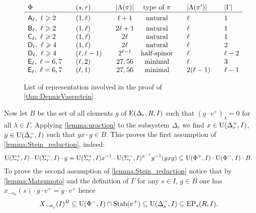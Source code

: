 \begin{figure}
\[\begin{array}{l @{\qquad} l @{\qquad} c @{\quad} c @{\qquad} l @{\qquad} l}
\Phi                                 & (s,r)         & |\Lambda(\pi)| & \text{type of $\pi$} & |\Lambda(\pi')|& |\Gamma|  \\ \hline\vphantom{\Bigl(}
\rA_\ell,\ \ell\geqslant 2           & (1,\ell)      & \ell+1         & \text{natural}       & \ell           & 1  \\     
\rB_\ell,\ \ell\geqslant 2           & (1,\ell)      & 2\ell+1        & \text{natural}       & \ell           & 1  \\     
\rC_\ell,\ \ell\geqslant 2           & (1,\ell)      & 2\ell          & \text{natural}       & \ell           & 1  \\
\rD_\ell,\ \ell\geqslant 4           & (1,\ell)      & 2\ell          & \text{natural}       & \ell           & 2  \\ 
\rD_\ell,\ \ell\geqslant 4           & (\ell,\ell-1) & 2^{\ell-1}     & \text{half-spinor}   & \ell           & \ell-2  \\
\rE_\ell,\ \ell=6,7                  & (\ell,2)      & 27, 56         & \text{minimal}       & \ell           & 3       \\ 
\rE_\ell,\ \ell=6,7                  & (\ell,1)      & 27, 56         & \text{minimal}       & 2(\ell-1)      & \ell-1  \end{array}\]
 \caption[Table]{List of representation involved in the proof of \cref{thm:DennisVaserstein}.} \label{fig:table}
\end{figure}

Now let $B$ be the set of all elements $g$ of $\operatorname{E}(\Delta_r,R, I)$ such that $(g \cdot v^+)_\lambda = 0$ for all $\lambda\in\Gamma$.
Applying \cref{lemma:uraction} to the subsystem $\Delta_r$ we find
$x\in\operatorname{U}(\Delta_r^+, I)$, $y\in \operatorname{U}(\Delta_r^-, I)$ such that $yx\cdot g \in B$.
This proves the first assumption of \cref{lemma:Stein_reduction}, indeed:
\[ \operatorname{U}(\Sigma^+_r, I) \cdot \operatorname{U}(\Sigma^-_r, I) \cdot g = \operatorname{U}(\Sigma^+_r, I) x^{-1} \cdot \operatorname{U}(\Sigma^-_r, I)^{x^{-1}} y^{-1} (yxg) \subseteq \operatorname{U}(\Phi^+, I) \cdot \operatorname{U}(\Phi^-, I) \cdot B. \]
To prove the second assumption of \cref{lemma:Stein_reduction} notice that by \cref{lemma:Matsumoto} and the definition of $\Gamma$ for any $s\in I$, $ g\in B$ one has $x_{-\alpha_r}(s) \cdot g \cdot v^+ = g \cdot v^+$ hence
\[ X_{-\alpha\ssub{r}}(I)^{B} \subseteq \U(\Phi^-, I) \cap \Stab(v^+) \subseteq \U(\Delta_s^-, I) \subseteq \EP_s(R, I). \]

